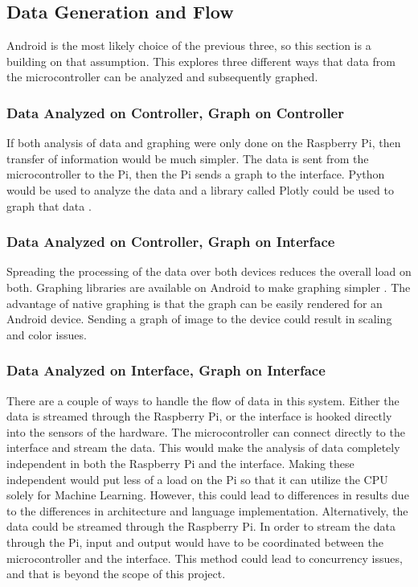 \subsection{Data Generation and Flow}
Android is the most likely choice of the previous three, so this section is a building on that assumption.
This explores three different ways that data from the microcontroller can be analyzed and subsequently graphed.

\subsubsection{Data Analyzed on Controller, Graph on Controller}
If both analysis of data and graphing were only done on the Raspberry Pi, then transfer of information would be much simpler.
The data is sent from the microcontroller to the Pi, then the Pi sends a graph to the interface.
Python would be used to analyze the data and a library called Plotly could be used to graph that data \cite{Plotly}.

\subsubsection{Data Analyzed on Controller, Graph on Interface}
Spreading the processing of the data over both devices reduces the overall load on both.
Graphing libraries are available on Android to make graphing simpler \cite{Graphview}.
The advantage of native graphing is that the graph can be easily rendered for an Android device.
Sending a graph of image to the device could result in scaling and color issues.

\subsubsection{Data Analyzed on Interface, Graph on Interface}
There are a couple of ways to handle the flow of data in this system.
Either the data is streamed through the Raspberry  Pi, or the interface is hooked directly into the sensors of the hardware.
The microcontroller can connect directly to the interface and stream the data.
This would make the analysis of data completely independent in both the Raspberry Pi and the interface.
Making these independent would put less of a load on the Pi so that it can utilize the CPU solely for Machine Learning.
However, this could lead to differences in results due to the differences in architecture and language implementation.
Alternatively, the data could be streamed through the Raspberry Pi.
In order to stream the data through the Pi, input and output would have to be coordinated between the microcontroller and the interface.
This method could lead to concurrency issues, and that is beyond the scope of this project.


